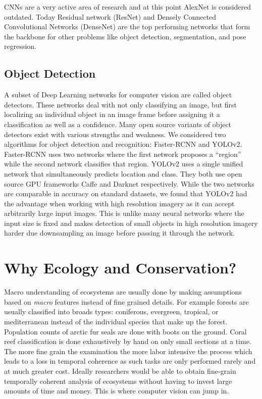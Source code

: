 CNNs are a very active area of research and at this point AlexNet is considered outdated. Today Residual network (ResNet) \cite{ResNet} and Densely Connected Convolutional Networks (DenseNet) \cite{DenseNet} are the top performing networks that form the backbone for other problems like object detection, segmentation, and pose regression.

\subsection{Object Detection}

A subset of Deep Learning networks for computer vision are called object detectors. These networks deal with not only classifying an image, but first localizing an individual object in an image frame before assigning it a classification as well as a confidence. Many open source variants of object detectors exist with various strengths and weakness. We considered two algorithms for object detection and recognition: Faster-RCNN and YOLOv2. Faster-RCNN \cite{FASTER-RCNN} uses two networks where the first network proposes a “region” while the second network classifies that region.  YOLOv2 \cite{YOLOv2} uses a single unified network that simultaneously predicts location and class. They both use open source GPU frameworks Caffe and Darknet respectively.  While the two networks are comparable in accuracy on standard datasets, we found that YOLOv2 had the advantage when working with high resolution imagery as it can accept arbitrarily large input images. This is unlike many neural networks where the input size is fixed and makes detection of small objects in high resolution imagery harder due downsampling an image before passing it through the network.


\section{Why Ecology and Conservation?}

Macro understanding of ecosystems are usually done by making assumptions based on \textit{macro} features instead of fine grained details. For example forests are usually classified into broads types: coniferous, evergreen, tropical, or mediterranean instead of the individual species that make up the forest. Population counts of arctic fur seals are done with boots on the ground. Coral reef classification is done exhaustively by hand on only small sections at a time. The more fine grain the examination the more labor intensive the process which leads to a loss in temporal coherence as such tasks are only performed rarely and at much greater cost. Ideally researchers would be able to obtain fine-grain temporally coherent analysis of ecosystems without having to invest large amounts of time and money. This is where computer vision can jump in.

